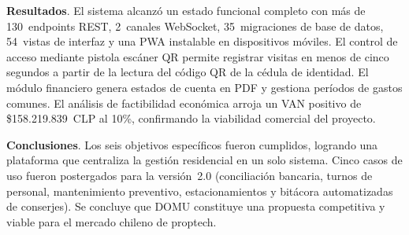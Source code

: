
\medskip
\noindent\textbf{Resultados}. El sistema alcanzó un estado funcional completo con más de 130~endpoints REST, 2~canales WebSocket, 35~migraciones de base de datos, 54~vistas de interfaz y una PWA instalable en dispositivos móviles. El control de acceso mediante pistola escáner QR permite registrar visitas en menos de cinco segundos a partir de la lectura del código QR de la cédula de identidad. El módulo financiero genera estados de cuenta en PDF y gestiona períodos de gastos comunes. El análisis de factibilidad económica arroja un VAN positivo de \$158.219.839~CLP al 10\%, confirmando la viabilidad comercial del proyecto.

\medskip
\noindent\textbf{Conclusiones}. Los seis objetivos específicos fueron cumplidos, logrando una plataforma que centraliza la gestión residencial en un solo sistema. Cinco casos de uso fueron postergados para la versión~2.0 (conciliación bancaria, turnos de personal, mantenimiento preventivo, estacionamientos y bitácora automatizadas de conserjes). Se concluye que DOMU constituye una propuesta competitiva y viable para el mercado chileno de proptech.

